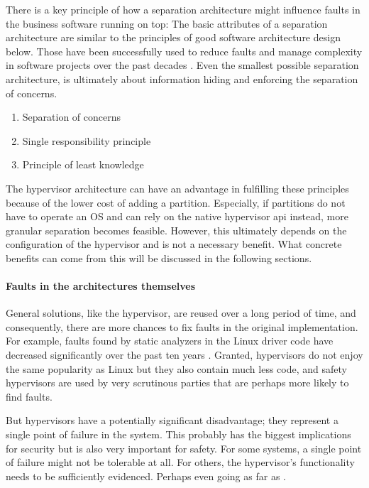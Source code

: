 There is a key principle of how a separation architecture might influence faults in the business software running on top: The basic attributes of a separation architecture are similar to the principles of good software architecture design below. Those have been successfully used to reduce faults and manage complexity in software projects over the past decades \cite{martin2009clean}. Even the smallest possible separation architecture, is ultimately about information hiding and enforcing the separation of concerns.
\begin{enumerate}
\item Separation of concerns
\item Single responsibility principle
\item Principle of least knowledge
\end{enumerate}
The hypervisor architecture can have an advantage in fulfilling these principles because of the lower cost of adding a partition. Especially, if partitions do not have to operate an OS and can rely on the native hypervisor \acrshort{api} instead, more granular separation becomes feasible. However, this ultimately depends on the configuration of the hypervisor and is not a necessary benefit.
What concrete benefits can come from this will be discussed in the following sections.
\paragraph{Faults in the architectures themselves}
General solutions, like the hypervisor, are reused over a long period of time, and consequently, there are more chances to fix faults in the original implementation. For example, faults found by static analyzers in the Linux driver code have decreased significantly over the past ten years \cite{palix2011faults}. Granted, hypervisors do not enjoy the same popularity as Linux but they also contain much less code, and safety hypervisors are used by very scrutinous parties that are perhaps more likely to find faults.

But hypervisors have a potentially significant disadvantage; they represent a single point of failure in the system. This probably has the biggest implications for security but is also very important for safety. For some systems, a single point of failure might not be tolerable at all. For others, the hypervisor's functionality needs to be sufficiently evidenced. Perhaps even going as far as  \cite{fernandez2013camkes}\cite{klein2009sel4}.

